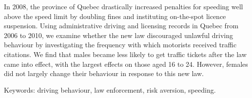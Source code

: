 

In 2008, the province of Quebec drastically increased penalties for speeding 
well above the speed limit by doubling fines and instituting on-the-spot licence suspension. 
Using administrative driving and licensing records in Quebec from 2006 to 2010, 
we examine whether the new law discouraged unlawful driving behaviour 
by investigating the frequency with which motorists received traffic citations. 
We find that males became less likely to get traffic tickets after the law came into effect, 
with the largest effects on those aged 16 to 24. 
However, females did not largely change their behaviour in response to this new law. 

\medskip
\noindent
Keywords: driving behaviour, law enforcement, risk aversion, speeding.
